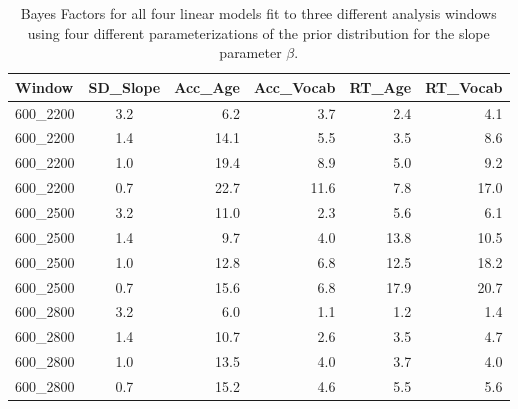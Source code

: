 \documentclass[a4paper]{article}
\begin{document}
\begin{table}[b]
\centering
\begin{tabular}{lc|rrrr}
  \hline
Window & SD\_Slope & Acc\_Age & Acc\_Vocab & RT\_Age & RT\_Vocab \\ 
  \hline
600\_2200 & 3.2 & 6.2 & 3.7 & 2.4 & 4.1 \\ 
  600\_2200 & 1.4 & 14.1 & 5.5 & 3.5 & 8.6 \\ 
  600\_2200 & 1.0 & 19.4 & 8.9 & 5.0 & 9.2 \\ 
  600\_2200 & 0.7 & 22.7 & 11.6 & 7.8 & 17.0 \\ 
  600\_2500 & 3.2 & 11.0 & 2.3 & 5.6 & 6.1 \\ 
  600\_2500 & 1.4 & 9.7 & 4.0 & 13.8 & 10.5 \\ 
  600\_2500 & 1.0 & 12.8 & 6.8 & 12.5 & 18.2 \\ 
  600\_2500 & 0.7 & 15.6 & 6.8 & 17.9 & 20.7 \\ 
  600\_2800 & 3.2 & 6.0 & 1.1 & 1.2 & 1.4 \\ 
  600\_2800 & 1.4 & 10.7 & 2.6 & 3.5 & 4.7 \\ 
  600\_2800 & 1.0 & 13.5 & 4.0 & 3.7 & 4.0 \\ 
  600\_2800 & 0.7 & 15.2 & 4.6 & 5.5 & 5.6 \\ 
   \hline
\end{tabular}
\caption{Bayes Factors for all four linear models fit to three different analysis windows using four different parameterizations of the prior distribution for the slope parameter $\beta$.} 
\end{table}



\clearpage

\end{document}
